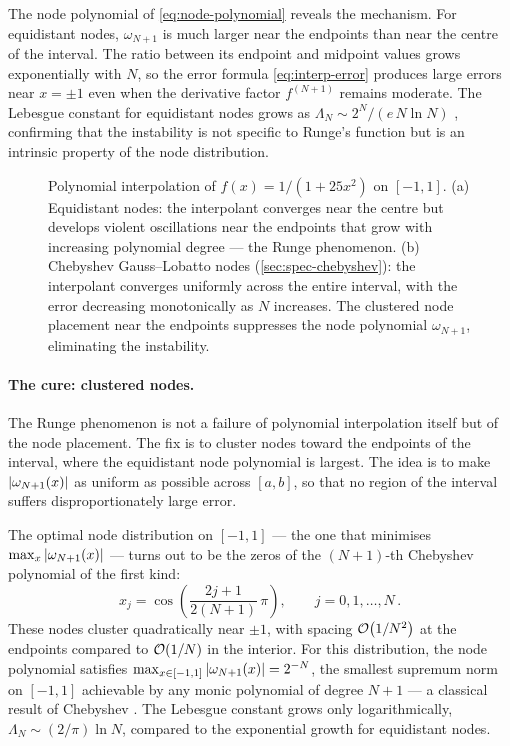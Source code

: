 The node polynomial of \cref{eq:node-polynomial} reveals the
mechanism.  For equidistant nodes, $\omega_{N+1}$
is much larger near the endpoints than near the centre of the
interval.  The ratio between its endpoint and midpoint values grows
exponentially with $N$, so the error formula \cref{eq:interp-error}
produces large errors near $x = \pm 1$ even when the derivative
factor $f^{(N+1)}$ remains moderate.  The Lebesgue constant for
equidistant nodes grows as
$\Lambda_N \sim 2^N / (e\,N\ln N)$ \cite{Trefethen2000}, confirming
that the instability is not specific to Runge's function but is an
intrinsic property of the node distribution.

\begin{figure}[t]
\centering

\caption[Runge phenomenon on equidistant vs.\ Chebyshev nodes]{%
  Polynomial interpolation of $f(x) = 1/(1 + 25x^2)$ on $[-1,1]$.
  (a) Equidistant nodes: the interpolant converges near the centre
  but develops violent oscillations near the endpoints that grow
  with increasing polynomial degree --- the Runge phenomenon.
  (b) Chebyshev Gauss--Lobatto nodes (\cref{sec:spec-chebyshev}):
  the interpolant converges uniformly across the entire interval,
  with the error decreasing monotonically as $N$ increases.  The
  clustered node placement near the endpoints suppresses the node
  polynomial $\omega_{N+1}$, eliminating the instability.}
\label{fig:runge-phenomenon}
\end{figure}

\paragraph{The cure: clustered nodes.}

The Runge phenomenon is not a failure of polynomial interpolation
itself but of the node placement.  The fix is to cluster nodes toward
the endpoints of the interval, where the equidistant node polynomial
is largest.  The idea is to make $\left\lvert \omega_{N+1}(x) \right\rvert$ as uniform as
possible across $[a, b]$, so that no region of the interval suffers
disproportionately large error.

The optimal node distribution on $[-1, 1]$ --- the one that minimises
$\max_{x} \left\lvert \omega_{N+1}(x) \right\rvert$ --- turns out to be the zeros of the
$(N+1)$-th Chebyshev polynomial of the first kind:
%
\begin{equation}
  x_j = \cos\!\left(\frac{2j + 1}{2(N+1)}\,\pi\right) ,
  \qquad j = 0, 1, \ldots, N \,.
  \label{eq:chebyshev-zeros}
\end{equation}
%
These nodes cluster quadratically near $\pm 1$, with spacing
$\mathcal{O}\!\left(1/N^2\right)$ at the endpoints compared to $\mathcal{O}\!\left(1/N\right)$ in the
interior.  For this distribution, the node polynomial satisfies
$\max_{x \in [-1,1]} \left\lvert \omega_{N+1}(x) \right\rvert = 2^{-N}$, the smallest
supremum norm on $[-1,1]$ achievable by any monic polynomial of
degree $N+1$ --- a classical result of Chebyshev \cite{Trefethen2000}.  The Lebesgue constant
grows only logarithmically, $\Lambda_N \sim (2/\pi)\ln N$, compared
to the exponential growth for equidistant nodes.

